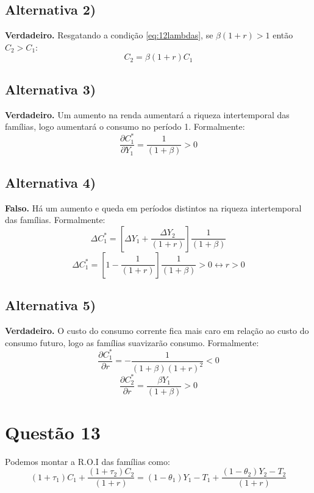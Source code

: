 \documentclass{article}
\begin{document}
\subsection*{Alternativa 2)}
\textbf{Verdadeiro.} Resgatando a condição \eqref{eq:12lambdas}, se $\beta(1+r)>1$ então $C_2>C_1$:
\begin{equation}
    C_2=\beta(1+r)C_1
\end{equation}
\subsection*{Alternativa 3)}
\textbf{Verdadeiro.} Um aumento na renda aumentará a riqueza intertemporal das famílias, logo aumentará o consumo no período 1. Formalmente:
\begin{equation}
    \frac{\partial C_1^*}{\partial Y_1}= \frac{1}{(1+\beta)}>0
\end{equation}
\subsection*{Alternativa 4)}
\textbf{Falso.} Há um aumento e queda em períodos distintos na riqueza intertemporal das famílias. Formalmente:
\begin{equation}
    \Delta C_1^*=\left[\Delta Y_1+\frac{\Delta Y_2}{(1+r)}\right]\frac{1}{(1+\beta)}
\end{equation}
\begin{equation}
    \Delta C_1^*=\left[1-\frac{1}{(1+r)}\right]\frac{1}{(1+\beta)} > 0 \leftrightarrow r>0
\end{equation}
\subsection*{Alternativa 5)}
\textbf{Verdadeiro.} O custo do consumo corrente fica mais caro em relação ao custo do consumo futuro, logo as famílias suavizarão consumo. Formalmente:
\begin{equation}
    \frac{\partial C_1^*}{\partial r}=-\frac{1}{(1+\beta)(1+r)^2} < 0
\end{equation}
\begin{equation}
    \frac{\partial C_2^*}{\partial r}=\frac{\beta Y_1}{(1+\beta)} > 0
\end{equation}
\clearpage

\section*{Questão 13} 
Podemos montar a R.O.I das famílias como:
\begin{equation}\label{eq:13roi}
    (1+\tau_1)C_1+\frac{(1+\tau_2)C_2}{(1+r)}=(1-\theta_1)Y_1-T_1+\frac{(1-\theta_2)Y_2-T_2}{(1+r)}
\end{equation}
\end{document}
